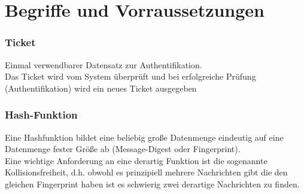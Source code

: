 \section{Begriffe und Vorraussetzungen}
\begin{frame}
	\frametitle{Ticket}
	\vspace{1cm}
	Einmal verwendbarer Datensatz zur Authentifikation.\\
	Das Ticket wird vom System überprüft und bei erfolgreiche Prüfung (Authentifikation) wird ein neues Ticket ausgegeben
\end{frame}
\begin{frame}
	\frametitle{Hash-Funktion}
	\vspace{1cm}
	Eine Hashfunktion bildet eine beliebig große Datenmenge eindeutig auf eine Datenmenge fester Größe ab (Message-Digest oder Fingerprint).\\
	Eine wichtige Anforderung an eine derartig Funktion ist die sogenannte Kollisionsfreiheit, d.h. obwohl es prinzipiell mehrere Nachrichten gibt die den gleichen Fingerprint haben ist es schwierig zwei derartige Nachrichten zu finden.
\end{frame}
